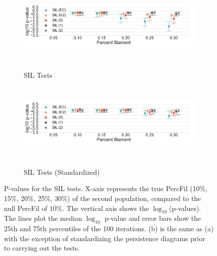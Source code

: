 \documentclass[12pt]{article}
\begin{document}
\begin{figure}[htp!]
  \centering
  \begin{subfigure}{.9\textwidth}
    \centering
    \caption{SIL Tests}
    \includegraphics[width=\linewidth, height = 1.5in]{figure_8_silhouette_group.pdf}
    \label{fig:sub_silh}
  \end{subfigure}
  \begin{subfigure}{.9\textwidth}
    \centering
    \caption{SIL Tests (Standardized)}
    \includegraphics[width=\linewidth, height = 1.5in]{figure_8_silhouette_group_normed.pdf}
    \label{fig:sub_silh_normed}
  \end{subfigure}
\label{fig:sub_silh_results}
\caption{P-values for the SIL tests. X-axis represents the true PercFil (10\%, 15\%, 20\%, 25\%, 30\%) of the second population, compared to the null PercFil of 10\%.
The vertical axis shows the $\log_{10}$(p-values). The lines plot the median $\log_{10}$ p-value and error bars show the 25th and 75th percentiles of the 100 iterations. (b) is the same as (a) with the exception of standardizing the persistence diagrams prior to carrying out the tests. }
\end{figure}
\end{document}
